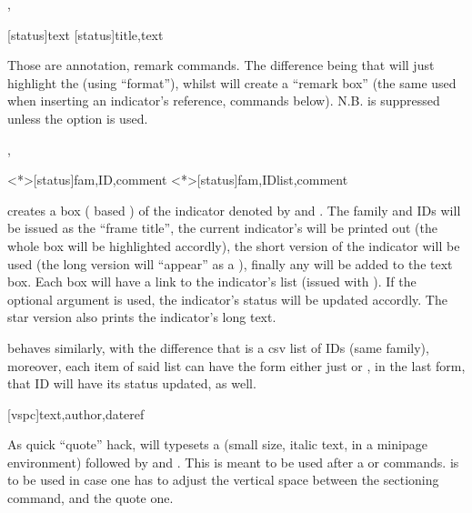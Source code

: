 \documentclass[dctools,english]{ufrgscca} %
\begin{document}
\begin{Macros}{\textmark, \comment}
	\begin{Syntax}%
	\Macro{\textmark}[status]{text}
	\Macro{\comment}[status]{title,text}
\end{Syntax}
Those are annotation, remark commands. The difference being that \Macro{\textmark}{} will just highlight the  (using  “format”), whilst  will create a “remark box” (the same used when inserting an indicator's reference, commands below). N.B. \Macro{\comment}{} is suppressed unless the option  is used.
\end{Macros}

\begin{Macros}{\indref,\indreflst}
	\begin{Syntax}%
	\Macro{\indref}<*>[status]{fam,ID,comment}
	\Macro{\indreflst}<*>[status]{fam,IDlist,comment}
\end{Syntax}
\Macro{\indref}{} creates a box ( based  ) of the indicator denoted by   and . The family and IDs will be issued as the “frame title”, the current indicator's  will be printed out (the whole box will be highlighted accordly), the short version of the indicator will be used (the long version will “appear” as a ), finally any  will be added to the text box. Each \Macro{\indref}{} box will have a link to the indicator's list (issued with \Macro{\PrintIndicators}{}). If the optional argument  is used, the indicator's status will be updated accordly. The star version also prints the indicator's long text.

\Macro{\indreflst}{} behaves similarly, with the difference that  is a csv list of IDs (same family), moreover, each item of said list can have the form either just  or , in the last form, that ID will have its status updated, as well.
\end{Macros}

\begin{Macros}{\fancyquote}
	\begin{Syntax}%
	\Macro{\fancyquote}[vspc]{text,author,dateref}
\end{Syntax}
As quick “quote” hack, \Macro{\fancyquote}{} will typesets a  (small size, italic  text, in a minipage environment) followed by  and . This is meant to be used after a \Macro{\chapter}{} or \Macro{\section}{} commands.  is to be used in case one has to adjust the vertical space between the sectioning command, and the quote one.
\end{Macros}
\end{document}
